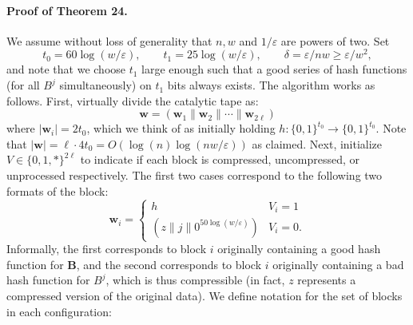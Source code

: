 \documentclass[10pt,a4paper]{article}
\begin{document}
\paragraph{Proof of Theorem 24.} We assume without loss of generality that $n,w$ and $1/\varepsilon$ are powers of two. Set
\[t_0=60\log(w/\varepsilon),\qquad t_1=25\log(w/\varepsilon),\qquad\delta=\varepsilon/nw\geq\varepsilon/w^2,\]
and note that we choose $t_1$ large enough such that a good series of hash functions (for all $B^j$ simultaneously) on $t_1$ bits always exists. The algorithm works as follows. First, virtually divide the catalytic tape as:
\[\mathbf w=(\mathbf w_1\|\mathbf w_2\|\cdots\|\mathbf w_{2\ell})\]
where $|\mathbf w_i|=2t_0$, which we think of as initially holding $h:\{0,1\}^{t_0}\to\{0,1\}^{t_0}$. Note that $|\mathbf w|=\ell\cdot4t_0=O(\log(n)\log(nw/\varepsilon))$ as claimed.
Next, initialize $V\in\{0,1,*\}^{2\ell}$ to indicate if each block is compressed, uncompressed, or unprocessed respectively. The first two cases correspond to the following two formats of the block:
\[\mathbf w_i=\begin{cases}h&V_i=1\\(z\|j\|0^{50\log(w/\varepsilon)})&V_i=0.\end{cases}\]
Informally, the first corresponds to block $i$ originally containing a good hash function for $\mathbf B$, and the second corresponds to block $i$ originally containing a bad hash function for $B^j$, which is thus compressible (in fact, $z$ represents a compressed version of the original data). We define notation for the set of blocks in each configuration:
\end{document}
